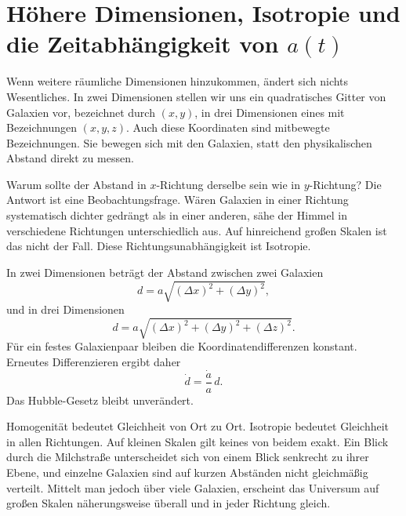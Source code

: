 \section{Höhere Dimensionen, Isotropie und die Zeitabhängigkeit von \(a(t)\)}

Wenn weitere räumliche Dimensionen hinzukommen, ändert sich nichts Wesentliches. In zwei Dimensionen stellen wir uns ein quadratisches Gitter von Galaxien vor, bezeichnet durch \((x,y)\), in drei Dimensionen eines mit Bezeichnungen \((x,y,z)\). Auch diese Koordinaten sind mitbewegte Bezeichnungen. Sie bewegen sich mit den Galaxien, statt den physikalischen Abstand direkt zu messen.

Warum sollte der Abstand in \(x\)-Richtung derselbe sein wie in \(y\)-Richtung? Die Antwort ist eine Beobachtungsfrage. Wären Galaxien in einer Richtung systematisch dichter gedrängt als in einer anderen, sähe der Himmel in verschiedene Richtungen unterschiedlich aus. Auf hinreichend großen Skalen ist das nicht der Fall. Diese Richtungsunabhängigkeit ist Isotropie.

In zwei Dimensionen beträgt der Abstand zwischen zwei Galaxien
\begin{equation}
d=a\sqrt{(\Delta x)^2+(\Delta y)^2},
\end{equation}
und in drei Dimensionen
\begin{equation}
d=a\sqrt{(\Delta x)^2+(\Delta y)^2+(\Delta z)^2}.
\end{equation}
Für ein festes Galaxienpaar bleiben die Koordinatendifferenzen konstant. Erneutes Differenzieren ergibt daher
\begin{equation}
\dot d=\frac{\dot a}{a}\,d.
\end{equation}
Das Hubble-Gesetz bleibt unverändert.

Homogenität bedeutet Gleichheit von Ort zu Ort. Isotropie bedeutet Gleichheit in allen Richtungen. Auf kleinen Skalen gilt keines von beidem exakt. Ein Blick durch die Milchstraße unterscheidet sich von einem Blick senkrecht zu ihrer Ebene, und einzelne Galaxien sind auf kurzen Abständen nicht gleichmäßig verteilt. Mittelt man jedoch über viele Galaxien, erscheint das Universum auf großen Skalen näherungsweise überall und in jeder Richtung gleich.

